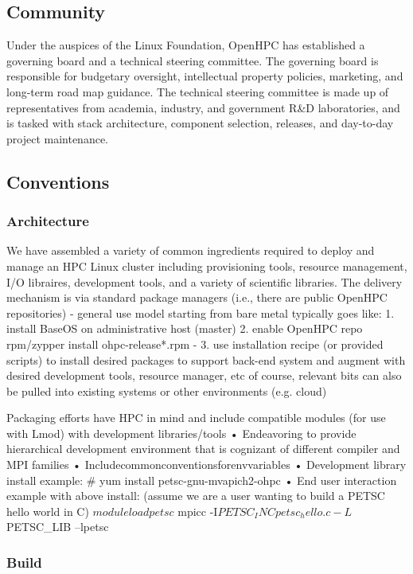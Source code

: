 \documentclass{sig-alternate-05-2015}
\begin{document}
\subsection{Community}
Under the auspices of the Linux Foundation, OpenHPC has established a governing
board and a technical steering committee. The governing board is responsible for
budgetary oversight, intellectual property policies, marketing, and long-term
road map guidance. The technical steering committee is made up of representatives
from academia, industry, and government R\&D laboratories, and is tasked with
stack architecture, component selection, releases, and day-to-day project
maintenance.

\subsection{Conventions}
\subsubsection{Architecture}
We have assembled a variety of common ingredients required to deploy and manage 
an HPC Linux cluster including provisioning tools, resource management, I/O 
libraires, development tools, and a variety of scientific libraries. The 
delivery mechanism is via standard package managers (i.e., there are public 
OpenHPC repositories)
 - general use model starting from bare metal typically goes like:
 1. install BaseOS on administrative host (master)
 2. enable OpenHPC repo rpm/zypper install ohpc-release*.rpm
 -
 3. use installation recipe (or provided scripts) to install desired packages to support back-end system and augment with desired development tools, resource manager, etc
 of course, relevant bits can also be pulled into existing systems or other environments (e.g. cloud)

 Packaging efforts have HPC in mind and include compatible modules (for use with Lmod) with development libraries/tools
 • Endeavoring to provide hierarchical development environment that is cognizant of different compiler and MPI families
 • Includecommonconventionsforenvvariables
 • Development library install example:
# yum install petsc-gnu-mvapich2-ohpc
 • End user interaction example with above install: (assume we are a user wanting to build a PETSC hello world in C)
 $ module load petsc
 $ mpicc -I$PETSC_INC petsc_hello.c -L$PETSC_LIB –lpetsc

\subsubsection{Build}
\end{document}
